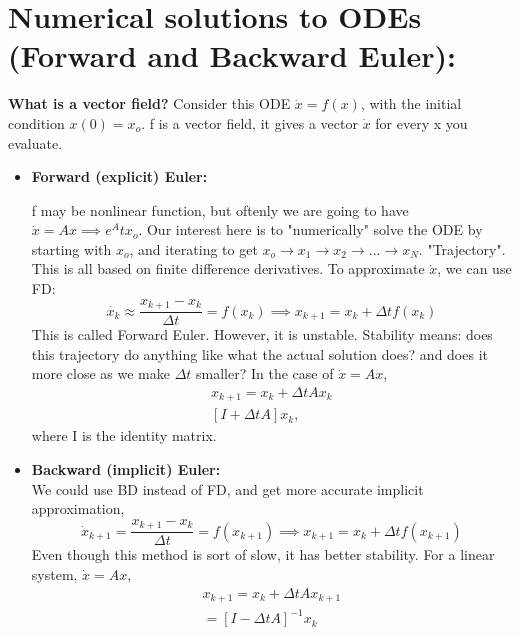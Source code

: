 \documentclass[11pt]{article}
\theoremstyle{definition}
\begin{document}
 
\section{Numerical solutions to ODEs (Forward and Backward Euler):}

{\bf What is a vector field?} Consider this ODE $\dot{x} = f(x)$, with the initial condition $x(0)={x_o}$. f is a vector field, it gives a vector $\dot{x}$ for every x you evaluate. 

\begin{itemize}
 \item {\bf Forward (explicit) Euler:}

f may be nonlinear function, but oftenly we are going to have $\dot{x}=Ax \implies e^At x_o$. Our interest here is to "numerically" solve the ODE by starting with $x_o$, and iterating to get $x_o \rightarrow x_1 \rightarrow x_2 \rightarrow ... \rightarrow x_N$. "Trajectory".
  This is all based on finite difference derivatives. To approximate $\dot{x}$, we can use FD:
  \begin{equation}
   \dot{x_k} \approx \frac{x_{k+1}-x_k}{\Delta t}=f(x_k) \implies x_{k+1}=x_k+\Delta t f(x_k)
  \end{equation}
This is called Forward Euler. However, it is unstable. Stability means: does this trajectory do anything like what the actual solution does? and does it more close as we make $\Delta t$ smaller?
In the case of $\dot{x} = Ax$,
\begin{equation}
\begin{flalign*}
     x_{k+1}=x_k+\Delta tAx_k\\
     [I+\Delta t A]x_k,
\end{flalign*}
\end{equation}
where I is the identity matrix.

\item {\bf Backward (implicit) Euler:}\\
We could use BD instead of FD, and get more accurate implicit approximation,
\begin{equation}
 \dot{x}_{k+1}=\frac{x_{k+1}-x_k}{\Delta t}=f(x_{k+1}) \implies x_{k+1}=x_k + \Delta t f(x_{k+1})
\end{equation}
Even though this method is sort of slow, it has better stability. For a linear system, $\dot{x} = Ax$,
\begin{equation}
\begin{flalign*}
 x_{k+1}=x_k+\Delta t Ax_{k+1}\\
 = [I-\Delta tA]^{-1}x_k
 \end{flalign*}
\end{equation}


\end{itemize}
\end{document}
